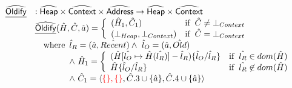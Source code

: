 \[\begin{array}{ll}
\widehat{\underline{\sf Oldify}} & : \widehat{\mbox{\textsf{Heap}}} \times \widehat{\mbox{\textsf{Context}}} \times \widehat{\mbox{\textsf{Address}}} \rightarrow \widehat{\mbox{\textsf{Heap}}} \times \widehat{\mbox{\textsf{Context}}}\\
 & \widehat{\underline{\sf Oldify}}(\hat{H},\hat{C}, \hat{a}) =
     \left\{
       \begin{array}{ll}
         (\hat{H}_1, \hat{C}_1) & {\rm if}\begin{array}[t]{l}\hat{C} \neq \bot_{Context}\end{array} \\
         (\bot_{Heap}, \bot_{Context}) & {\rm if}\begin{array}[t]{l}\hat{C} = \bot_{Context}\end{array} \\
       \end{array}
     \right.\\
 & \quad{\rm where}\begin{array}[t]{l}
   \hat{l}_R = (\hat{a}, \hat{Recent}) \land\ \hat{l}_O = (\hat{a}, \hat{Old})\\
   \land\ \hat{H}_1 =
     \left\{
       \begin{array}{ll}
         (\hat{H}[\hat{l_O}\mapsto \hat{H}(\hat{l_R})]-\hat{l}_R)\{\hat{l}_O / \hat{l}_R\}
         & {\rm if}\begin{array}[t]{l}\hat{l_R}\in dom(\hat{H})\end{array} \\
         \hat{H}\{\hat{l}_O / \hat{l}_R\}
         & {\rm if}\begin{array}[t]{l}\hat{l_R}\not\in dom(\hat{H})\end{array} \\
       \end{array}
     \right.\\
   \land\ \hat{C}_1 = \langle {\color{red}\{ \}, \{ \}}, \hat{C}.3 \cup \{\hat{a}\}, \hat{C}.4 \cup \{\hat{a}\} \rangle
\end{array}\\
\\\\


\end{array}\]
